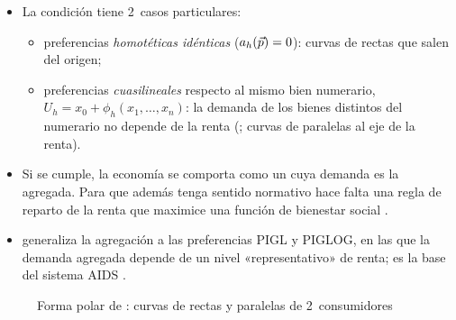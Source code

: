 \documentclass[11pt]{article}
\begin{document}
\begin{itemize}
\begin{itemize}
    \begin{itemize}
    \item Por la identidad de , equivale a que las  entre consumidores: el efecto renta $\partial x_{hi}/\partial\overline{W}_h$ es el mismo para todos, de modo que lo que gana uno al recibir renta lo compensa exactamente lo que pierde el que la cede\nocite{MasColellWhinstonGreen1995}.
    \end{itemize}
  \item La condición tiene 2~casos particulares:
    \begin{itemize}
    \item preferencias \emph{homotéticas idénticas} ($a_h(\vec{p})=0$): curvas de  rectas que salen del origen;
    \item preferencias \emph{cuasilineales} respecto al mismo bien numerario, $U_h=x_0+\phi_h(x_1,\dots,x_n)$: la demanda de los bienes distintos del numerario no depende de la renta (; curvas de  paralelas al eje de la renta).
    \end{itemize}
  \item Si se cumple, la economía se comporta como un  cuya demanda es la agregada. Para que además tenga sentido normativo hace falta una regla de reparto de la renta que maximice una función de bienestar social .
  \item \textcite{Muellbauer1975Aggregation,Muellbauer1976Community} generaliza la agregación a las preferencias PIGL y PIGLOG, en las que la demanda agregada depende de un nivel «representativo» de renta; es la base del sistema AIDS .
  \end{itemize}
\end{itemize}

\begin{figure}[H]
\centering
\caption{Forma polar de : curvas de  rectas y paralelas de 2~consumidores}\label{fig:engel-gorman}
\end{figure}
\end{document}
